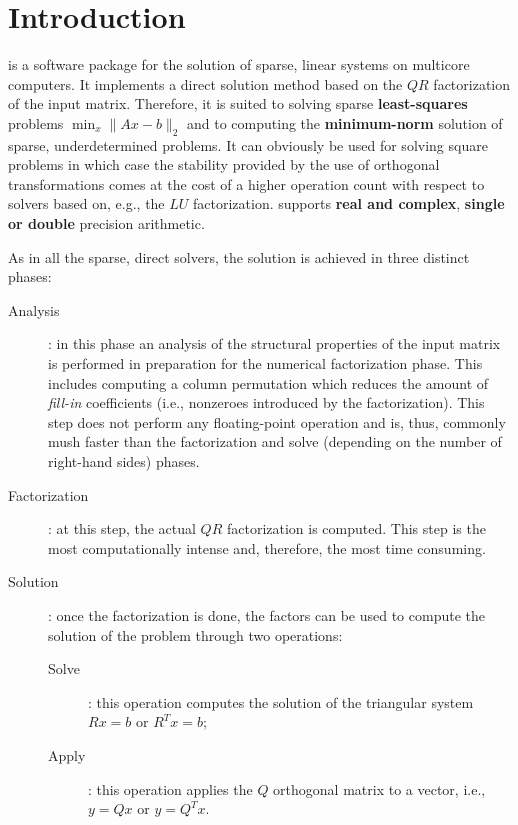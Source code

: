\documentclass[11pt]{article}
\begin{document}


\newpage

\tableofcontents
\newpage

\section{Introduction}
\label{sec:intro}

\qrm is a software package for the solution of sparse, linear systems
on multicore computers. It implements a direct solution method based
on the $QR$ factorization of the input matrix. Therefore, it is suited
to solving sparse {\bf least-squares} problems $\min_x\|Ax-b\|_2$ and
to computing the {\bf minimum-norm} solution of sparse,
underdetermined problems. It can obviously be used for solving square
problems in which case the stability provided by the use of orthogonal
transformations comes at the cost of a higher operation count with
respect to solvers based on, e.g., the $LU$ factorization. \qrm
supports {\bf real and complex}, {\bf single or double} precision
arithmetic.

As in all the sparse, direct solvers, the solution is achieved in
three distinct phases:
\begin{description}
\item[Analysis]: in this phase an analysis of the structural properties
  of the input matrix is performed in preparation for the numerical
  factorization phase. This includes computing a column permutation
  which reduces the amount of {\it fill-in} coefficients (i.e.,
  nonzeroes introduced by the factorization). This step does not
  perform any floating-point operation and is, thus, commonly mush
  faster than the factorization and solve (depending on the number of
  right-hand sides) phases.
\item[Factorization]: at this step, the actual $QR$ factorization is
  computed. This step is the most computationally intense and,
  therefore, the most time consuming.
\item[Solution]: once the factorization is done, the factors can be used
  to compute the solution of the problem through two operations:
  \begin{description}
  \item[Solve] : this operation computes the solution of the
    triangular system $Rx=b$ or $R^Tx=b$;
  \item[Apply] : this operation applies the $Q$ orthogonal matrix to a
    vector, i.e., $y = Qx$ or $y = Q^Tx$.
  \end{description}
\end{description}
\end{document}
